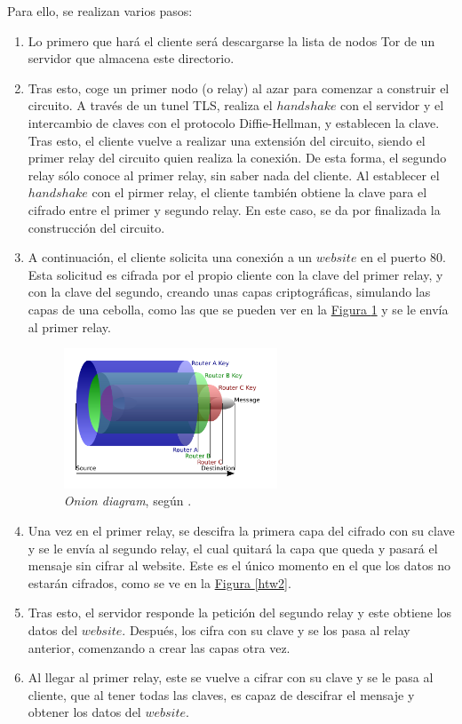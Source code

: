 \documentclass[10pt,a4paper,spanish]{article}
\begin{document}
Para ello, se realizan varios pasos:
\begin{enumerate}
    \item Lo primero que hará el cliente será descargarse la lista de nodos Tor de un servidor que almacena este directorio.
    \item Tras esto, coge un primer nodo (o relay) al azar para comenzar a construir el circuito. A través de un tunel TLS, realiza el $handshake$ con el servidor y el intercambio de claves con el protocolo Diffie-Hellman, y establecen la clave. Tras esto, el cliente vuelve a realizar una extensión del circuito, siendo el primer relay del circuito quien realiza la conexión. De esta forma, el segundo relay sólo conoce al primer relay, sin saber nada del cliente. Al establecer el $handshake$ con el pirmer relay, el cliente también obtiene la clave para el cifrado entre el primer y segundo relay. En este caso, se da por finalizada la construcción del circuito.
    \item A continuación, el cliente solicita una conexión a un $website$ en el puerto 80. Esta solicitud es cifrada por el propio cliente con la clave del primer relay, y con la clave del segundo, creando unas capas criptográficas, simulando las capas de una cebolla, como las que se pueden ver en la \hyperref[cebollas]{Figura \ref*{cebollas}} y se le envía al primer relay.
    
    \begin{figure}[!h]
        \centering
        \includegraphics[width=0.6\textwidth]{Onion}
        \caption{\textit{Onion diagram}, según \cite{cebollas}.}
        \label{cebollas}
    \end{figure}

    \item Una vez en el primer relay, se descifra la primera capa del cifrado con su clave y se le envía al segundo relay, el cual quitará la capa que queda y pasará el mensaje sin cifrar al website. Este es el único momento en el que los datos no estarán cifrados, como se ve en la \hyperref[htw2]{Figura \ref*{htw2}}.

    \item Tras esto, el servidor responde la petición del segundo relay y este obtiene los datos del $website$. Después, los cifra con su clave y se los pasa al relay anterior, comenzando a crear las capas otra vez.

    \item Al llegar al primer relay, este se vuelve a cifrar con su clave y se le pasa al cliente, que al tener todas las claves, es capaz de descifrar el mensaje y obtener los datos del $website$.

\end{enumerate}
\end{document}
